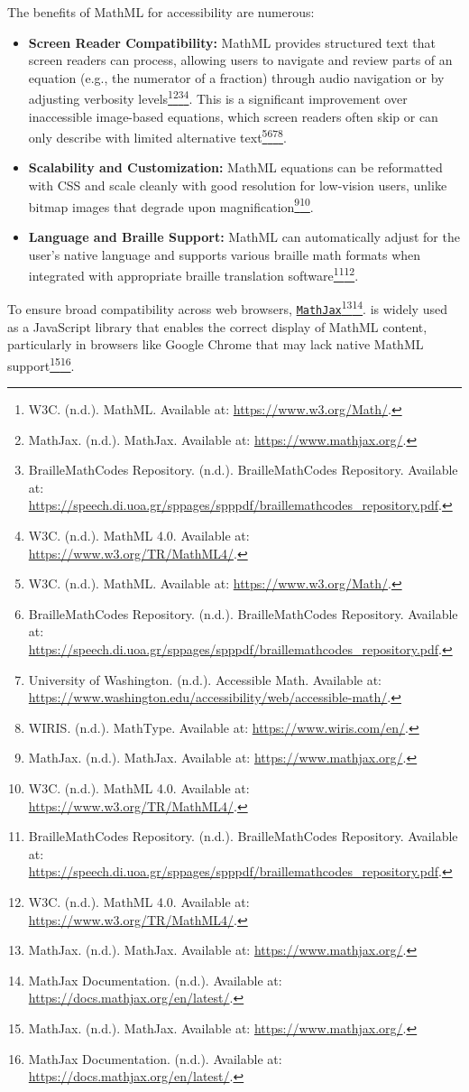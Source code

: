 The benefits of MathML for accessibility are numerous:

\begin{itemize}
\item \textbf{Screen Reader Compatibility:} MathML provides structured text that screen readers can process, allowing users to navigate and review parts of an equation (e.g., the numerator of a fraction) through audio navigation or by adjusting verbosity levels\footnote{W3C. (n.d.). MathML. Available at: \url{https://www.w3.org/Math/}.}\footnote{MathJax. (n.d.). MathJax. Available at: \url{https://www.mathjax.org/}.}\footnote{BrailleMathCodes Repository. (n.d.). BrailleMathCodes Repository. Available at: \url{https://speech.di.uoa.gr/sppages/spppdf/braillemathcodes_repository.pdf}.}\footnote{W3C. (n.d.). MathML 4.0. Available at: \url{https://www.w3.org/TR/MathML4/}.}. This is a significant improvement over inaccessible image-based equations, which screen readers often skip or can only describe with limited alternative text\footnote{W3C. (n.d.). MathML. Available at: \url{https://www.w3.org/Math/}.}\footnote{BrailleMathCodes Repository. (n.d.). BrailleMathCodes Repository. Available at: \url{https://speech.di.uoa.gr/sppages/spppdf/braillemathcodes_repository.pdf}.}\footnote{University of Washington. (n.d.). Accessible Math. Available at: \url{https://www.washington.edu/accessibility/web/accessible-math/}.}\footnote{WIRIS. (n.d.). MathType. Available at: \url{https://www.wiris.com/en/}.}.
\item \textbf{Scalability and Customization:} MathML equations can be reformatted with CSS and scale cleanly with good resolution for low-vision users, unlike bitmap images that degrade upon magnification\footnote{MathJax. (n.d.). MathJax. Available at: \url{https://www.mathjax.org/}.}\footnote{W3C. (n.d.). MathML 4.0. Available at: \url{https://www.w3.org/TR/MathML4/}.}.
\item \textbf{Language and Braille Support:} MathML can automatically adjust for the user's native language and supports various braille math formats when integrated with appropriate braille translation software\footnote{BrailleMathCodes Repository. (n.d.). BrailleMathCodes Repository. Available at: \url{https://speech.di.uoa.gr/sppages/spppdf/braillemathcodes_repository.pdf}.}\footnote{W3C. (n.d.). MathML 4.0. Available at: \url{https://www.w3.org/TR/MathML4/}.}.
\end{itemize}

To ensure broad compatibility across web browsers, \href{https://www.mathjax.org/}{\texttt{MathJax}}\footnote{MathJax. (n.d.). MathJax. Available at: \url{https://www.mathjax.org/}.}\footnote{MathJax Documentation. (n.d.). Available at: \url{https://docs.mathjax.org/en/latest/}.}. is widely used as a JavaScript library that enables the correct display of MathML content, particularly in browsers like Google Chrome that may lack native MathML support\footnote{MathJax. (n.d.). MathJax. Available at: \url{https://www.mathjax.org/}.}\footnote{MathJax Documentation. (n.d.). Available at: \url{https://docs.mathjax.org/en/latest/}.}.

